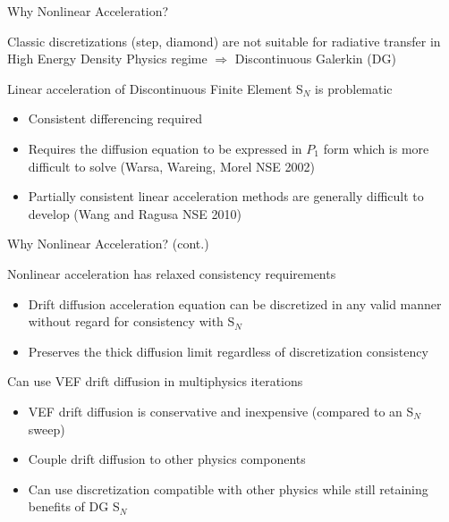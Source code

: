 \documentclass[10pt]{beamer}
\newcommand{\SN}{S$_N$\xspace}
\begin{document}
\begin{frame}{Why Nonlinear Acceleration?}


		Classic discretizations (step, diamond) are not suitable for radiative transfer in High Energy Density Physics regime $\Rightarrow$ Discontinuous Galerkin (DG) 

		Linear acceleration of Discontinuous Finite Element \SN is problematic 
		\begin{itemize}
			\item Consistent differencing required 

			\item Requires the diffusion equation to be expressed in $P_1$ form which is more difficult to solve (Warsa, Wareing, Morel NSE 2002) 

			\item Partially consistent linear acceleration methods are generally difficult to develop (Wang and Ragusa NSE 2010)

		\end{itemize}


\end{frame}

\begin{frame}{Why Nonlinear Acceleration? (cont.)}


		Nonlinear acceleration has relaxed consistency requirements 
		\begin{itemize}
			\item Drift diffusion acceleration equation can be discretized in any valid manner without regard for consistency with \SN  

			\item Preserves the thick diffusion limit regardless of discretization consistency 
		\end{itemize}

		Can use VEF drift diffusion in multiphysics iterations 
		\begin{itemize}

			\item VEF drift diffusion is conservative and inexpensive (compared to an \SN sweep) 

			\item Couple drift diffusion to other physics components 

			\item Can use discretization compatible with other physics while still retaining benefits of DG \SN 

		\end{itemize}


\end{frame}
\end{document}
